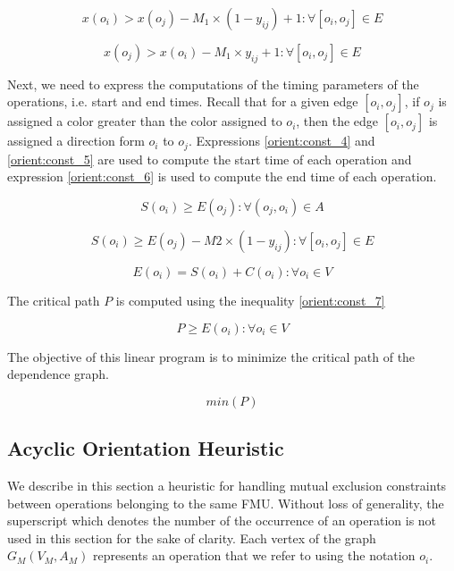 \begin{equation}
x(o_i) > x(o_j) - M_1 \times (1-y_{ij}) + 1: \forall [o_i,o_j] \in E
\label{orient:const_2}
\end{equation} 

\begin{equation}
x(o_j) > x(o_i) - M_1 \times y_{ij} + 1: \forall [o_i,o_j] \in E
\label{orient:const_3}
\end{equation}

Next, we need to express the computations of the timing parameters of the operations, i.e. start and end times. Recall that for a given edge $[o_i,o_j]$, if $o_j$ is assigned a color greater than the color assigned to $o_i$, then the edge $[o_i, o_j]$ is assigned a direction form $o_i$ to $o_j$. Expressions \ref{orient:const_4} and \ref{orient:const_5} are used to compute the start time of each operation and expression \ref{orient:const_6} is used to compute the end time of each operation.

\begin{equation}
S(o_i) \geq E(o_j): \forall (o_j,o_i) \in A
\label{orient:const_4}
\end{equation} 

\begin{equation}
S(o_i) \geq E(o_j) - M2 \times (1-y_{ij}): \forall [o_i,o_j] \in E
\label{orient:const_5}
\end{equation}

\begin{equation}
E(o_i) = S(o_i) + C(o_i): \forall o_i \in V
\label{orient:const_6}
\end{equation}
 
The critical path $P$ is computed using the inequality \ref{orient:const_7}

\begin{equation}
P \geq E(o_i): \forall o_i \in V
\label{orient:const_7}
\end{equation}

The objective of this linear program is to minimize the critical path of the dependence graph.

\begin{equation}
min(P)
\label{orient:obj}
\end{equation}


\subsection{Acyclic Orientation Heuristic}

We describe in this section a heuristic for handling mutual exclusion constraints between operations belonging to the same FMU. Without loss of generality, the superscript which denotes the number of the occurrence of an operation is not used in this section for the sake of clarity. Each vertex of the graph $G_M(V_M,A_M)$ represents an operation that we refer to using the notation $o_i$.

